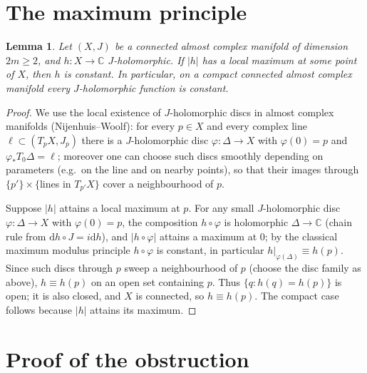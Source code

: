 \documentclass[11pt]{article}
\newtheorem{lemma}[theorem]{Lemma}
\theoremstyle{definition}
\theoremstyle{remark}
\newcommand{\CC}{\mathbb{C}}
\newcommand{\dd}{\mathrm{d}}
\begin{document}
\section{The maximum principle}\label{sec:max}

\begin{lemma}\label{lem:max}
Let $(X,J)$ be a connected almost complex manifold of dimension
$2m\ge2$, and $h\colon X\to\CC$ $J$-holomorphic. If $|h|$ has a
local maximum at some point of $X$, then $h$ is constant. In
particular, on a compact connected almost complex manifold every
$J$-holomorphic function is constant.
\end{lemma}

\begin{proof}
We use the local existence of $J$-holomorphic discs in almost
complex manifolds (Nijenhuis--Woolf): for every $p\in X$ and every
complex line $\ell\subset(T_pX,J_p)$ there is a $J$-holomorphic disc
$\varphi\colon\Delta\to X$ with $\varphi(0)=p$ and
$\varphi_{*}T_0\Delta=\ell$; moreover one can choose such discs
smoothly depending on parameters (e.g.\ on the line and on nearby
points), so that their images through $\{p'\}\times\{$lines in
$T_{p'}X\}$ cover a neighbourhood of $p$.

Suppose $|h|$ attains a local maximum at $p$. For any small
$J$-holomorphic disc $\varphi\colon\Delta\to X$ with
$\varphi(0)=p$, the composition $h\circ\varphi$ is holomorphic
$\Delta\to\CC$ (chain rule from $\dd h\circ J=i\dd h$), and
$|h\circ\varphi|$ attains a maximum at $0$; by the classical
maximum modulus principle $h\circ\varphi$ is constant, in
particular $h|_{\varphi(\Delta)}\equiv h(p)$. Since such discs
through $p$ sweep a neighbourhood of $p$ (choose the disc family as
above), $h\equiv h(p)$ on an open set containing $p$. Thus
$\{q:h(q)=h(p)\}$ is open; it is also closed, and $X$ is
connected, so $h\equiv h(p)$. The compact case follows because
$|h|$ attains its maximum.
\end{proof}

\section{Proof of the obstruction}\label{sec:proof}
\end{document}
